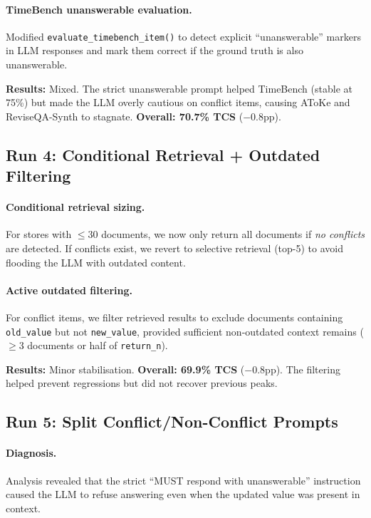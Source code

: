 \documentclass[11pt,a4paper]{article}
\begin{document}
\paragraph{TimeBench unanswerable evaluation.}
Modified \texttt{evaluate\_timebench\_item()} to detect explicit ``unanswerable''
markers in LLM responses and mark them correct if the ground truth is
also unanswerable.

\textbf{Results:}
Mixed.  The strict unanswerable prompt helped TimeBench (stable at 75\%)
but made the LLM overly cautious on conflict items, causing AToKe and
ReviseQA-Synth to stagnate.  \textbf{Overall: 70.7\% TCS} ($-$0.8pp).


\subsection{Run 4: Conditional Retrieval + Outdated Filtering}

\paragraph{Conditional retrieval sizing.}
For stores with $\leq 30$ documents, we now only return all documents if
\emph{no conflicts} are detected.  If conflicts exist, we revert to selective
retrieval (top-5) to avoid flooding the LLM with outdated content.

\paragraph{Active outdated filtering.}
For conflict items, we filter retrieved results to exclude documents
containing \texttt{old\_value} but not \texttt{new\_value}, provided
sufficient non-outdated context remains ($\geq 3$ documents or half of
\texttt{return\_n}).

\textbf{Results:}
Minor stabilisation.  \textbf{Overall: 69.9\% TCS} ($-$0.8pp).  The
filtering helped prevent regressions but did not recover previous peaks.


\subsection{Run 5: Split Conflict/Non-Conflict Prompts}

\paragraph{Diagnosis.}
Analysis revealed that the strict ``MUST respond with unanswerable'' instruction
caused the LLM to refuse answering even when the updated value was present
in context.
\end{document}
